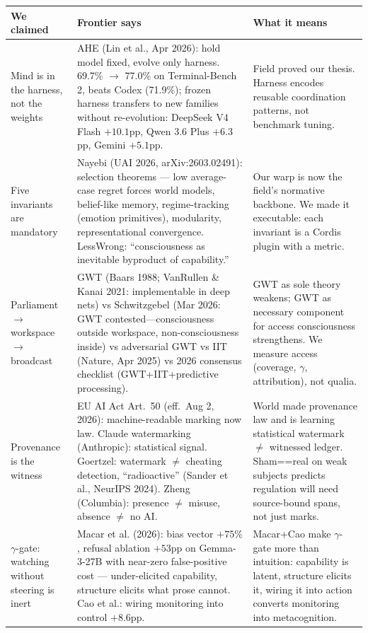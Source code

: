 \documentclass[11pt]{article}
\begin{document}
\begin{table}[h]
\centering
\small
\begin{tabular}{P{2.8cm}P{4.2cm}P{5.8cm}}
\toprule
We claimed & Frontier says & What it means \\
\midrule
Mind is in the harness, not the weights &
AHE (Lin et al., Apr 2026): hold model fixed, evolve only harness. 69.7\% $\to$\allowbreak{} 77.0\% on Terminal-Bench 2, beats Codex (71.9\%); frozen harness transfers to new families without re-evolution: DeepSeek V4 Flash $+10.1$pp, Qwen 3.6 Plus $+6.3$pp, Gemini $+5.1$pp. &
Field proved our thesis. Harness encodes reusable coordination patterns, not benchmark tuning. \\
Five invariants are mandatory &
Nayebi (UAI 2026, arXiv:2603.02491): selection theorems --- low average-case regret forces world models, belief-like memory, regime-tracking (emotion primitives), modularity, representational convergence. LessWrong: ``consciousness as inevitable byproduct of capability.'' &
Our warp is now the field's normative backbone. We made it executable: each invariant is a Cordis plugin with a metric. \\
Parliament $\to$\allowbreak{} workspace $\to$\allowbreak{} broadcast &
GWT (Baars 1988; VanRullen \& Kanai 2021: implementable in deep nets) vs Schwitzgebel (Mar 2026: GWT contested---consciousness outside workspace, non-consciousness inside) vs adversarial GWT vs IIT (Nature, Apr 2025) vs 2026 consensus checklist (GWT+IIT+predictive processing). &
GWT as sole theory weakens; GWT as necessary component for access consciousness strengthens. We measure access (coverage, $\gamma$, attribution), not qualia. \\
Provenance is the witness &
EU AI Act Art.~50 (eff.\ Aug 2, 2026): machine-readable marking now law. Claude watermarking (Anthropic): statistical signal. Goertzel: watermark $\neq$ cheating detection, ``radioactive'' (Sander et al., NeurIPS 2024). Zheng (Columbia): presence $\neq$ misuse, absence $\neq$ no AI. &
World made provenance law and is learning statistical watermark $\neq$ witnessed ledger. Sham==real on weak subjects predicts regulation will need source-bound spans, not just marks. \\
$\gamma$-gate: watching without steering is inert &
Macar et al. (2026): bias vector $+75\%$, refusal ablation $+53$pp on Gemma-3-27B with near-zero false-positive cost --- under-elicited capability, structure elicits what prose cannot. Cao et al.: wiring monitoring into control $+8.6$pp. &
Macar+Cao make $\gamma$-gate more than intuition: capability is latent, structure elicits it, wiring it into action converts monitoring into metacognition. \\

\end{tabular}
\end{table}
\end{document}
